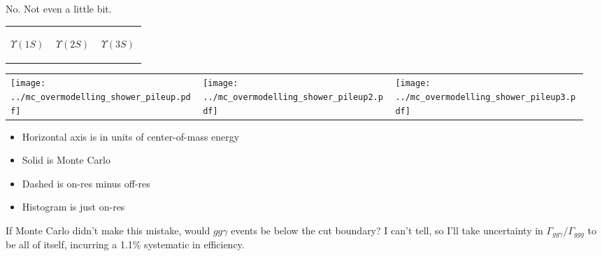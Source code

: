 \documentclass[landscape]{article}
\begin{document}
\begin{center}  \end{center}

\pagebreak

No.  Not even a little bit.

\vspace{-1.75 cm}
\begin{center}
  \begin{tabular}{p{0.32\linewidth} p{0.32\linewidth} p{0.32\linewidth}}
    \begin{center} $\Upsilon(1S)$ \end{center} & \begin{center} $\Upsilon(2S)$ \end{center} & \begin{center} $\Upsilon(3S)$ \end{center} \\
  \end{tabular}

  \vspace{-0.75 cm}
  \begin{tabular}{p{0.32\linewidth} p{0.32\linewidth} p{0.32\linewidth}}
    \texttt{[image: ../mc\_overmodelling\_shower\_pileup.pdf]} &
    \texttt{[image: ../mc\_overmodelling\_shower\_pileup2.pdf]} &
    \texttt{[image: ../mc\_overmodelling\_shower\_pileup3.pdf]}
  \end{tabular}
\end{center}

\begin{itemize}
  \item Horizontal axis is in units of center-of-mass energy

  \item Solid is Monte Carlo

  \item Dashed is on-res minus off-res

  \item Histogram is just on-res
\end{itemize}

\vfill

If Monte Carlo didn't make this mistake, would $gg\gamma$ events be
below the cut boundary?  I can't tell, so I'll take uncertainty in
$\Gamma_{gg\gamma}/\Gamma_{ggg}$ to be all of itself, incurring a
1.1\% systematic in efficiency.

\vfill

\pagebreak
\end{document}
